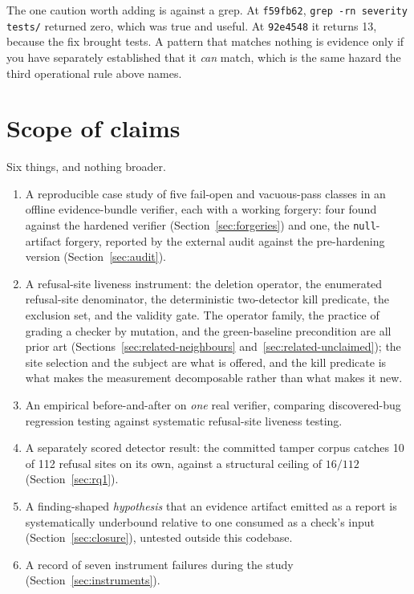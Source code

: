 \documentclass[11pt]{article}
\begin{document}
The one caution worth adding is against a grep. At \texttt{f59fb62},
\texttt{grep -rn severity tests/} returned zero, which was true and useful. At
\texttt{92e4548} it returns 13, because the fix brought tests. A pattern that matches nothing
is evidence only if you have separately established that it \emph{can} match, which is the
same hazard the third operational rule above names.

\section{Scope of claims}
\label{sec:scope}

Six things, and nothing broader.

\begin{enumerate}
\item A reproducible case study of five fail-open and vacuous-pass classes in an offline
evidence-bundle verifier, each with a working forgery: four found against the hardened
verifier (Section~\ref{sec:forgeries}) and one, the \texttt{null}-artifact forgery, reported
by the external audit against the pre-hardening version (Section~\ref{sec:audit}).
\item A refusal-site liveness instrument: the deletion operator, the enumerated refusal-site
denominator, the deterministic two-detector kill predicate, the exclusion set, and the
validity gate. The operator family, the practice of grading a checker by mutation, and the
green-baseline precondition are all prior art (Sections~\ref{sec:related-neighbours}
and~\ref{sec:related-unclaimed}); the site selection and the subject are what is offered,
and the kill predicate is what makes the measurement decomposable rather than what makes it
new.
\item An empirical before-and-after on \emph{one} real verifier, comparing discovered-bug
regression testing against systematic refusal-site liveness testing.
\item A separately scored detector result: the committed tamper corpus catches 10 of 112
refusal sites on its own, against a structural ceiling of $16/112$
(Section~\ref{sec:rq1}).
\item A finding-shaped \emph{hypothesis} that an evidence artifact emitted as a report is
systematically underbound relative to one consumed as a check's input
(Section~\ref{sec:closure}), untested outside this codebase.
\item A record of seven instrument failures during the study
(Section~\ref{sec:instruments}).
\end{enumerate}
\end{document}
